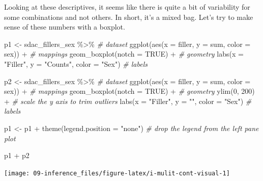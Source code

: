 \documentclass[
]{article}
\newenvironment{Shaded}{\begin{snugshade}}{\end{snugshade}}
\newcommand{\AttributeTok}[1]{\textcolor[rgb]{0.77,0.63,0.00}{#1}}
\newcommand{\CommentTok}[1]{\textcolor[rgb]{0.56,0.35,0.01}{\textit{#1}}}
\newcommand{\ConstantTok}[1]{\textcolor[rgb]{0.00,0.00,0.00}{#1}}
\newcommand{\DecValTok}[1]{\textcolor[rgb]{0.00,0.00,0.81}{#1}}
\newcommand{\FunctionTok}[1]{\textcolor[rgb]{0.00,0.00,0.00}{#1}}
\newcommand{\NormalTok}[1]{#1}
\newcommand{\OtherTok}[1]{\textcolor[rgb]{0.56,0.35,0.01}{#1}}
\newcommand{\SpecialCharTok}[1]{\textcolor[rgb]{0.00,0.00,0.00}{#1}}
\newcommand{\StringTok}[1]{\textcolor[rgb]{0.31,0.60,0.02}{#1}}
\begin{document}
Looking at these descriptives, it seems like there is quite a bit of variability for some combinations and not others. In short, it's a mixed bag. Let's try to make sense of these numbers with a boxplot.

\begin{Shaded}
\begin{Highlighting}[]
\NormalTok{p1 }\OtherTok{\textless{}{-}} 
\NormalTok{  sdac\_fillers\_sex }\SpecialCharTok{\%\textgreater{}\%} \CommentTok{\# dataset}
  \FunctionTok{ggplot}\NormalTok{(}\FunctionTok{aes}\NormalTok{(}\AttributeTok{x =}\NormalTok{ filler, }\AttributeTok{y =}\NormalTok{ sum, }\AttributeTok{color =}\NormalTok{ sex)) }\SpecialCharTok{+} \CommentTok{\# mappings}
  \FunctionTok{geom\_boxplot}\NormalTok{(}\AttributeTok{notch =} \ConstantTok{TRUE}\NormalTok{) }\SpecialCharTok{+} \CommentTok{\# geometry}
  \FunctionTok{labs}\NormalTok{(}\AttributeTok{x =} \StringTok{"Filler"}\NormalTok{, }\AttributeTok{y =} \StringTok{"Counts"}\NormalTok{, }\AttributeTok{color =} \StringTok{"Sex"}\NormalTok{) }\CommentTok{\# labels}

\NormalTok{p2 }\OtherTok{\textless{}{-}} 
\NormalTok{  sdac\_fillers\_sex }\SpecialCharTok{\%\textgreater{}\%} \CommentTok{\# dataset}
  \FunctionTok{ggplot}\NormalTok{(}\FunctionTok{aes}\NormalTok{(}\AttributeTok{x =}\NormalTok{ filler, }\AttributeTok{y =}\NormalTok{ sum, }\AttributeTok{color =}\NormalTok{ sex)) }\SpecialCharTok{+} \CommentTok{\# mappings}
  \FunctionTok{geom\_boxplot}\NormalTok{(}\AttributeTok{notch =} \ConstantTok{TRUE}\NormalTok{) }\SpecialCharTok{+} \CommentTok{\# geometry}
  \FunctionTok{ylim}\NormalTok{(}\DecValTok{0}\NormalTok{, }\DecValTok{200}\NormalTok{) }\SpecialCharTok{+} \CommentTok{\# scale the y axis to trim outliers}
  \FunctionTok{labs}\NormalTok{(}\AttributeTok{x =} \StringTok{"Filler"}\NormalTok{, }\AttributeTok{y =} \StringTok{""}\NormalTok{, }\AttributeTok{color =} \StringTok{"Sex"}\NormalTok{) }\CommentTok{\# labels}

\NormalTok{p1 }\OtherTok{\textless{}{-}}\NormalTok{ p1 }\SpecialCharTok{+} \FunctionTok{theme}\NormalTok{(}\AttributeTok{legend.position =} \StringTok{"none"}\NormalTok{) }\CommentTok{\# drop the legend from the left pane plot}

\NormalTok{p1 }\SpecialCharTok{+}\NormalTok{ p2}
\end{Highlighting}
\end{Shaded}

\begin{center}\texttt{[image: 09-inference\_files/figure-latex/i-mulit-cont-visual-1]} \end{center}
\end{document}
